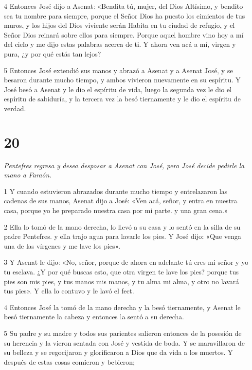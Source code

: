 \par 4 Entonces José dijo a Asenat: «Bendita tú, mujer, del Dios Altísimo, y bendito sea tu nombre para siempre, porque el Señor Dios ha puesto los cimientos de tus muros, y los hijos del Dios viviente serán Habita en tu ciudad de refugio, y el Señor Dios reinará sobre ellos para siempre. Porque aquel hombre vino hoy a mí del cielo y me dijo estas palabras acerca de ti. Y ahora ven acá a mí, virgen y pura, ¿y por qué estás tan lejos?

\par 5 Entonces José extendió sus manos y abrazó a Asenat y a Asenat José, y se besaron durante mucho tiempo, y ambos vivieron nuevamente en su espíritu. Y José besó a Asenat y le dio el espíritu de vida, luego la segunda vez le dio el espíritu de sabiduría, y la tercera vez la besó tiernamente y le dio el espíritu de verdad.

\chapter{20}

\par \textit{Pentefres regresa y desea desposar a Asenat con José, pero José decide pedirle la mano a Faraón.}

\par 1 Y cuando estuvieron abrazados durante mucho tiempo y entrelazaron las cadenas de sus manos, Asenat dijo a José: «Ven acá, señor, y entra en nuestra casa, porque yo he preparado nuestra casa por mi parte. y una gran cena.»

\par 2 Ella lo tomó de la mano derecha, lo llevó a su casa y lo sentó en la silla de su padre Pentefres. y ella trajo agua para lavarle los pies. Y José dijo: «Que venga una de las vírgenes y me lave los pies».

\par 3 Y Asenat le dijo: «No, señor, porque de ahora en adelante tú eres mi señor y yo tu esclava. ¿Y por qué buscas esto, que otra virgen te lave los pies? porque tus pies son mis pies, y tus manos mis manos, y tu alma mi alma, y ​​otro no lavará tus pies». Y ella lo contuvo y le lavó el fect.

\par 4 Entonces José la tomó de la mano derecha y la besó tiernamente, y Asenat le besó tiernamente la cabeza y entonces la sentó a su derecha.

\par 5 Su padre y su madre y todos sus parientes salieron entonces de la posesión de su herencia y la vieron sentada con José y vestida de boda. Y se maravillaron de su belleza y se regocijaron y glorificaron a Dios que da vida a los muertos. Y después de estas cosas comieron y bebieron;

